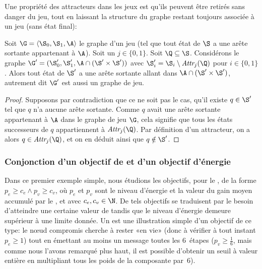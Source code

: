 Une propriété des attracteurs dans les jeux est qu'ils peuvent être retirés sans danger du jeu, tout en laissant la structure du graphe restant toujours associée à un jeu (\cad sans état final):
\begin{lemma}\label{tj:lem:removeattr}
Soit $\G = \langle \S_0, \S_1, \A\rangle$ le graphe d'un jeu (\cad tel que tout état de $\S$ a une arête sortante appartenant à $\A$).
Soit un  $j \in \{0,1\}$.
Soit $\Q \subseteq \S$.
Considérons le graphe $\G' = (\S_0', \S_1', \A \cap (\S' \times \S'))$ avec $\S_i' = \S_i \setminus \attractor{j}(\Q)$ pour $i \in \{0,1\}$.
Alors tout état de $\S'$ a une arête sortante allant dans $\A \cap (\S' \times \S')$, autrement dit $\G'$ est aussi un graphe de jeu.
\end{lemma}

\begin{proof}
Supposons par contradiction que ce ne soit pas le cas, \cad qu'il existe $q \in \S'$ tel que $q$ n'a aucune arête sortante.
Comme $q$ avait une arête sortante appartenant à $\A$ dans le graphe de jeu $\G$, cela signifie que tous les états successeurs de $q$ appartiennent à $\attractor{j}(\Q)$.
Par définition d'un attracteur, on a alors $q \in \attractor{j}(\Q)$, et on en déduit ainsi que $q \notin \S'$.
\end{proof}

\subsubsection{Conjonction d'un objectif de  et d'un objectif d'énergie}

Dans ce premier exemple simple, nous étudions les objectifs, pour le \jo, de la forme $p_e \geq c_e \wedge p_v \geq c_v$, où $p_e$ et $p_v$ sont le niveau d'énergie et la valeur du gain moyen accumulé par le \jo, et avec $c_e, c_v \in \N$.
De tels objectifs se traduisent par le besoin d'atteindre une certaine valeur de  tandis que le niveau d'énergie demeure supérieur à une limite donnée.
Un  est une illustration simple d'un objectif de ce type: le nœud compromis cherche à rester «en vie» (donc à vérifier à tout instant $p_e \geq 1$) tout en émettant au moins un message toutes les 6~étapes ($p_v \geq \frac1{6}$, mais comme nous l'avons remarqué plus haut, il est possible d'obtenir un seuil à valeur entière en multipliant tous les poids de la composante par~6).

